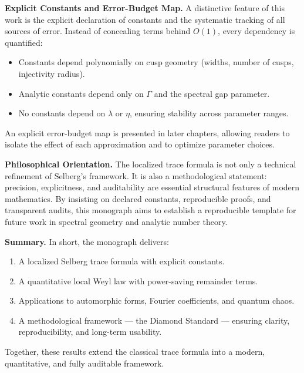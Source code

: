 \medskip
\noindent\textbf{Explicit Constants and Error-Budget Map.}
A distinctive feature of this work is the explicit declaration of constants and
the systematic tracking of all sources of error. Instead of concealing terms
behind $O(1)$, every dependency is quantified:
\begin{itemize}
  \item Constants depend polynomially on cusp geometry (widths, number of
  cusps, injectivity radius).
  \item Analytic constants depend only on $\Gamma$ and the spectral gap
  parameter.
  \item No constants depend on $\lambda$ or $\eta$, ensuring stability across
  parameter ranges.
\end{itemize}
An explicit error-budget map is presented in later chapters, allowing readers
to isolate the effect of each approximation and to optimize parameter choices.

\medskip
\noindent\textbf{Philosophical Orientation.}
The localized trace formula is not only a technical refinement of Selberg’s
framework. It is also a methodological statement: precision, explicitness, and
auditability are essential structural features of modern mathematics. By
insisting on declared constants, reproducible proofs, and transparent audits,
this monograph aims to establish a reproducible template for future work in
spectral geometry and analytic number theory.

\medskip
\noindent\textbf{Summary.}
In short, the monograph delivers:
\begin{enumerate}
  \item A localized Selberg trace formula with explicit constants.  
  \item A quantitative local Weyl law with power-saving remainder terms.  
  \item Applications to automorphic forms, Fourier coefficients, and quantum
  chaos.  
  \item A methodological framework --- the Diamond Standard --- ensuring
  clarity, reproducibility, and long-term usability.  
\end{enumerate}
Together, these results extend the classical trace formula into a modern,
quantitative, and fully auditable framework.
